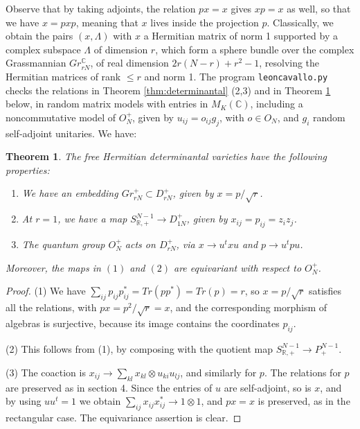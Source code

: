 \documentclass[11pt]{article}
\theoremstyle{plain}
\newtheorem{theorem}{Theorem}[section]
\begin{document}
Observe that by taking adjoints, the relation $px=x$ gives $xp=x$ as well, so that we have $x=pxp$, meaning that $x$ lives inside the projection $p$. Classically, we obtain the pairs $(x,\Lambda)$ with $x$ a Hermitian matrix of norm 1 supported by a complex subspace $\Lambda$ of dimension $r$, which form a sphere bundle over the complex Grassmannian $Gr^\mathbb C_{rN}$, of real dimension $2r(N-r)+r^2-1$, resolving the Hermitian matrices of rank $\leq r$ and norm 1. The program {\tt leoncavallo.py} checks the relations in Theorem \ref{thm:determinantal} (2,3) and in Theorem \ref{thm:hermitian} below, in random matrix models with entries in $M_K(\mathbb C)$, including a noncommutative model of $O_N^+$, given by $u_{ij}=o_{ij}g_j$, with $o\in O_N$, and $g_i$ random self-adjoint unitaries. We have:

\begin{theorem}
\label{thm:hermitian}
The free Hermitian determinantal varieties have the following properties:
\begin{enumerate}
\item We have an embedding $Gr^+_{rN}\subset D^+_{rN}$, given by $x=p/\sqrt{r}$.

\item At $r=1$, we have a map $S^{N-1}_{\mathbb R,+}\to D^+_{1N}$, given by $x_{ij}=p_{ij}=z_iz_j$.

\item The quantum group $O_N^+$ acts on $D^+_{rN}$, via $x\to u^txu$ and $p\to u^tpu$.
\end{enumerate}
Moreover, the maps in $(1)$ and $(2)$ are equivariant with respect to $O_N^+$.
\end{theorem}

\begin{proof}
(1) We have $\sum_{ij}p_{ij}p_{ij}^*=Tr(pp^*)=Tr(p)=r$, so $x=p/\sqrt{r}$ satisfies all the relations, with $px=p^2/\sqrt{r}=x$, and the corresponding morphism of algebras is surjective, because its image contains the coordinates $p_{ij}$.

(2) This follows from (1), by composing with the quotient map $S^{N-1}_{\mathbb R,+}\to P^{N-1}_+$.

(3) The coaction is $x_{ij}\to\sum_{kl}x_{kl}\otimes u_{ki}u_{lj}$, and similarly for $p$. The relations for $p$ are preserved as in section 4. Since the entries of $u$ are self-adjoint, so is $x$, and by using $uu^t=1$ we obtain $\sum_{ij}x_{ij}x_{ij}^*\to1\otimes1$, and $px=x$ is preserved, as in the rectangular case. The equivariance assertion is clear.
\end{proof}
\end{document}
